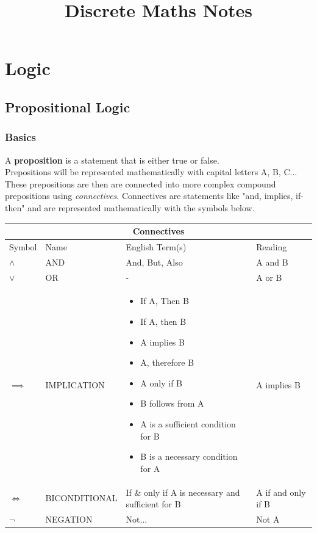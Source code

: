 \documentclass[12pt, letterpaper]{article}
\title{Discrete Maths Notes}
\begin{document}
\maketitle
{\small \tableofcontents}
\pagebreak


\section{Logic}
\bigbreak\bigbreak
\subsection{Propositional Logic}
\bigbreak
\subsubsection{Basics}

\indent
{}A \textbf{proposition} is a statement that is either true or false. \\
Prepositions will be represented mathematically with capital letters A, B, C... \\ These prepositions are then are connected into more complex compound prepositions using \emph{connectives}. Connectives are statements like "and, implies, if-then" and are represented mathematically with the symbols below.

\begin{center}
\begin{tabular}{ |p{1.5cm}|p{3.75cm}|p{5.8cm}|p{3.25cm}| }
 \hline
 \multicolumn{4}{|c|}{Connectives} \\
 \hline
 \hline
 \rowcolor{lightgray} Symbol& Name & English Term(s) & Reading \\
 \hline
 	$\land$ 	& 	AND 		& And, But, Also	& A and B  	\\
	\hline
 	$\lor$ 		& 	OR 			& -	& A or B	\\
	\hline
 	$\implies$ 	& 	IMPLICATION	& \begin{itemize}[leftmargin=*, label={}]
		\item If A, Then B
		\item If A, then B
	 	\item A implies B
		\item A, therefore B
		\item A only if B
		\item B follows from A
		\item A is a sufficient condition for B
		\item B is a necessary condition for A 
	\end{itemize} & A implies B \\
	\hline
	$\iff$ 		&	BICONDITIONAL	& If \& only if	 A is necessary and sufficient for B & A if and only if B 	\\
	\hline
	$\neg$ 		&	NEGATION		& Not... & Not A \\
 \hline	
\end{tabular}
\end{center}
\end{document}
